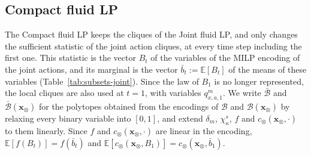 \documentclass{article}
\begin{document}
\subsection{Compact fluid LP}
\label{sec:compact}

The Compact fluid LP keeps the cliques of the Joint fluid LP, and only changes the sufficient statistic of the joint
action cliques, at every time step including the first one. This statistic is the vector $B_t$ of the variables of the
MILP encoding of the joint actions, and its marginal is the vector $\bar b_t := \mathbb{E}[B_t]$ of the means of these
variables (Table~\ref{tab:subsets-joint}). Since the law of $B_1$ is no longer represented, the local cliques are also
used at $t = 1$, with variables $q^m_{x,a,1}$. We write $\bar{\mathcal{B}}$ and $\bar{\mathcal{B}}(\mathbf{x}_\otimes)$
for the polytopes obtained from the encodings of $\mathcal{B}$ and $\mathcal{B}(\mathbf{x}_\otimes)$ by relaxing every
binary variable into $[0,1]$, and extend $\delta_m$, $\chi^s_\kappa$, $f$ and $c_\otimes(\mathbf{x}_\otimes, \cdot)$ to
them linearly. Since $f$ and $c_\otimes(\mathbf{x}_\otimes, \cdot)$ are linear in the encoding,
$\mathbb{E}[f(B_t)] = f(\bar b_t)$ and $\mathbb{E}[c_\otimes(\mathbf{x}_\otimes, B_1)] = c_\otimes(\mathbf{x}_\otimes,
\bar b_1)$.
\end{document}
